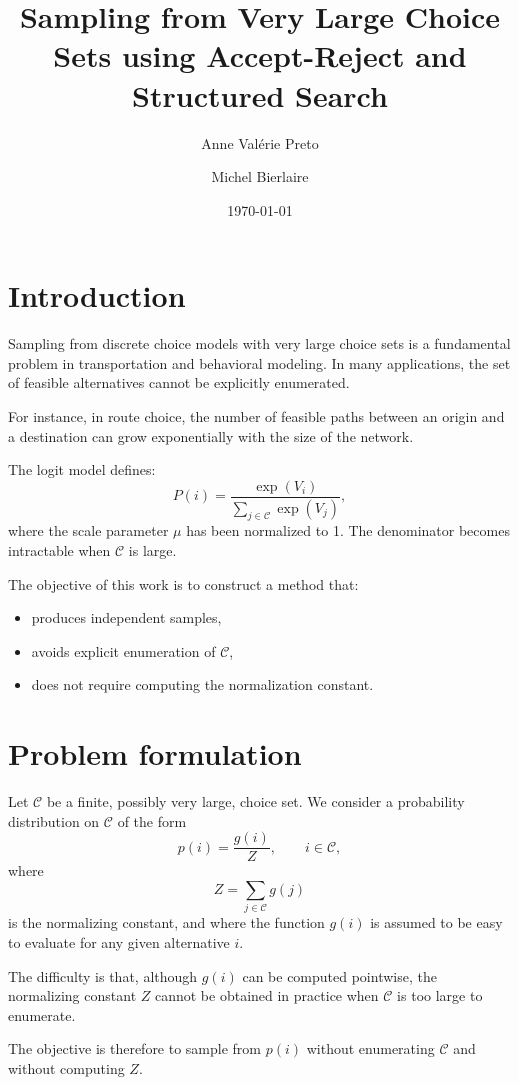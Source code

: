 \documentclass[11pt]{article}
\title{Sampling from Very Large Choice Sets using Accept-Reject and Structured Search}
\author{Anne Valérie Preto \and Michel Bierlaire}
\date{\today}
\begin{document}
\maketitle

\section{Introduction}

Sampling from discrete choice models with very large choice sets is a fundamental problem in transportation and behavioral modeling. In many applications, the set of feasible alternatives cannot be explicitly enumerated.

For instance, in route choice, the number of feasible paths between an origin and a destination can grow exponentially with the size of the network.

The logit model defines:
\[
P(i) = \frac{\exp(V_i)}{\sum_{j \in \mathcal{C}} \exp(V_j)},
\]
where the scale parameter $\mu$ has been normalized to 1.
The denominator becomes intractable when $\mathcal{C}$ is large.

The objective of this work is to construct a method that:
\begin{itemize}
\item produces independent samples,
\item avoids explicit enumeration of $\mathcal{C}$,
\item does not require computing the normalization constant.
\end{itemize}

\section{Problem formulation}

Let $\mathcal{C}$ be a finite, possibly very large, choice set. We consider a probability distribution on $\mathcal{C}$ of the form
\[
p(i) = \frac{g(i)}{Z}, \qquad i \in \mathcal{C},
\]
where
\[
Z = \sum_{j \in \mathcal{C}} g(j)
\]
is the normalizing constant, and where the function $g(i)$ is assumed to be easy to evaluate for any given alternative $i$.

The difficulty is that, although $g(i)$ can be computed pointwise, the normalizing constant $Z$ cannot be obtained in practice when $\mathcal{C}$ is too large to enumerate.

The objective is therefore to sample from $p(i)$ without enumerating $\mathcal{C}$ and without computing $Z$.
\end{document}
